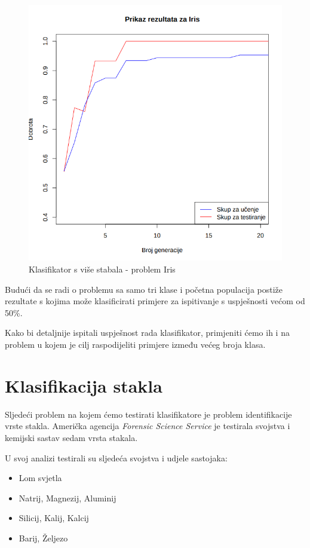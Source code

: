 \documentclass[times, utf8, zavrsni]{fer}
\begin{document}
 
\begin{figure}[htb]
\centering
\includegraphics[scale=0.45]{grafovi/iris2}
\caption{Klasifikator s više stabala - problem Iris}
\end{figure}

Budući da se radi o problemu sa samo tri klase i početna populacija postiže rezultate s kojima može klasificirati primjere za ispitivanje s uspješnosti većom od 50\%.

Kako bi detaljnije ispitali uspješnost rada klasifikator, primjeniti ćemo ih i na problem u kojem je cilj raspodijeliti primjere između većeg broja klasa.


\section{Klasifikacija stakla}

Sljedeći problem na kojem ćemo testirati klasifikatore je problem identifikacije vrste stakla. Američka agencija \textit{Forensic Science Service} je testirala svojstva i kemijski sastav sedam vrsta stakala.

U svoj analizi testirali su sljedeća svojstva i udjele sastojaka:
\begin{itemize}
\item Lom svjetla
\item Natrij, Magnezij, Aluminij
\item Silicij, Kalij, Kalcij
\item Barij, Željezo

\end{itemize}
\end{document}
